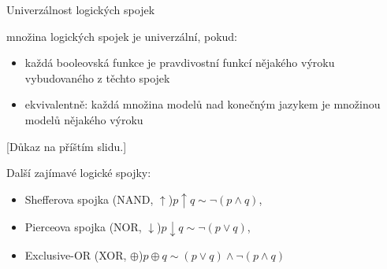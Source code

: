 \documentclass{beamer}
\begin{document}
\begin{frame}{Univerzálnost logických spojek}

    množina logických spojek je \alert{univerzální}, pokud:
    \begin{itemize}        
        \item každá booleovská funkce je pravdivostní funkcí nějakého výroku vybudovaného z těchto spojek\pause
        \item ekvivalentně: každá množina modelů nad konečným jazykem je množinou modelů nějakého výroku
    \end{itemize}

    \pause
    
    {\footnotesize [Důkaz na příštím slidu.]}

    \pause
    Další zajímavé logické spojky:
    \begin{itemize}
        \item \alert{Shefferova spojka} (NAND, $\uparrow$)\hfill $p\uparrow q \sim \neg (p\land q)$,
        \item \alert{Pierceova spojka} (NOR, $\downarrow$)\hfill $p\downarrow q \sim \neg (p\lor q)$,
        \item \alert{Exclusive-OR} (XOR, $\oplus$)\hfill $p\oplus q \sim (p\lor q)\land\neg(p\land q)$
    \end{itemize}

    \pause

\end{frame}
\end{document}

